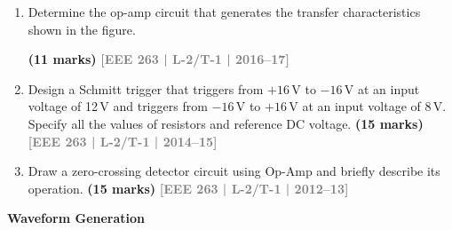 \documentclass[12pt,a3paper]{article}
\newcommand{\yr}[1]{\hfill\textcolor{gray}{\small\textbf{[#1]}}}
\newcommand{\mk}[1]{\textcolor{orange!70!black}{\small\textbf{(#1 marks)}}}
\newcommand{\subtopic}[2]{%
  \vspace{10pt}
  \noindent\begin{tcolorbox}[colback=#1!8,colframe=#1,boxrule=0.6pt,arc=4pt,
    left=6pt,right=6pt,top=4pt,bottom=4pt]
    \small\bfseries\textcolor{#1}{#2}
  \end{tcolorbox}
  \vspace{2pt}
}
\begin{document}
\begin{enumerate}
    
\item Determine the op-amp circuit that generates the transfer characteristics shown in the figure.
\begin{center}
  
\end{center}
\mk{11} \yr{EEE 263 | L-2/T-1 | 2016--17}

\item Design a Schmitt trigger that triggers from $+16\,\text{V}$ to $-16\,\text{V}$ at an input voltage of 12\,V and triggers from $-16\,\text{V}$ to $+16\,\text{V}$ at an input voltage of 8\,V. Specify all the values of resistors and reference DC voltage.
\mk{15} \yr{EEE 263 | L-2/T-1 | 2014--15}

\item Draw a zero-crossing detector circuit using Op-Amp and briefly describe its operation.
\mk{15} \yr{EEE 263 | L-2/T-1 | 2012--13}

\end{enumerate}

\subtopic{cE}{Waveform Generation}
\label{sub:s7-wave}
\end{document}

